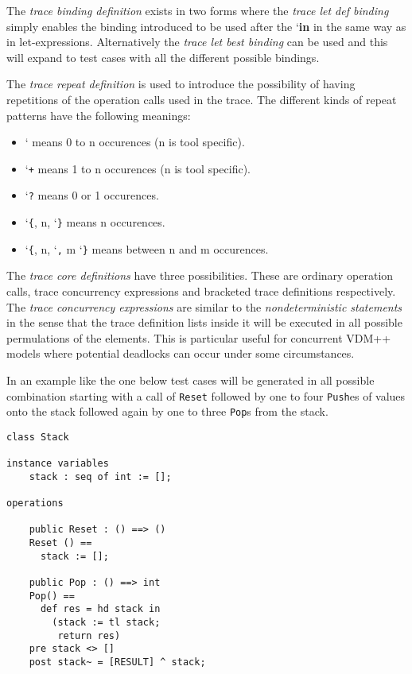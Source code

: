 \documentclass{overturerepchap}
\newcommand{\Lit}[1]{`{\tt #1}\Quote}
\newcommand{\Lop}[1]{`{\bf\ttfamily #1}\Quote}
\begin{document}
{\begin{description}
The \emph{trace binding definition} exists in two forms where the
\emph{trace let def binding} simply enables the binding introduced to
be used after the \Lop{in} in the same way as in
let-expressions. Alternatively the \emph{trace let best binding} can
be used and this will expand to test cases with all the different
possible bindings.

The \emph{trace repeat definition} is used to introduce the
possibility of having repetitions of the operation calls used in the
trace.
The different kinds of repeat patterns have the following meanings:
\begin{itemize}
\item  \Lit{*} means 0 to n occurences (n is tool specific).
\item  \Lit{+} means 1 to n occurences (n is tool specific).
\item  \Lit{?} means 0 or 1 occurences.
\item  \Lit{\{}, n, \Lit{\}} means n occurences.
\item  \Lit{\{}, n, \Lit{,} m \Lit{\}} means between n and m occurences.
\end{itemize}

The \emph{trace core definitions} have three possibilities. These are
ordinary operation calls, trace concurrency expressions and bracketed
trace definitions respectively.
The \emph{trace concurrency expressions} are similar to the
\emph{nondeterministic statements} in the sense that the trace
definition lists inside it will be executed in all possible
permulations of the elements. This is particular useful for concurrent
VDM++ models where potential deadlocks can occur under some
circumstances.

\item[Examples:] In an example like the one below test cases will be
generated in all possible combination starting with a call
of \texttt{Reset} followed by one to four \texttt{Push}es of values
onto the stack followed again by one to three \texttt{Pop}s from the stack. \\
\begin{lstlisting}
class Stack

instance variables
    stack : seq of int := [];

operations

    public Reset : () ==> ()
    Reset () ==
      stack := [];

    public Pop : () ==> int
    Pop() ==
      def res = hd stack in
        (stack := tl stack;
         return res)
    pre stack <> []
    post stack~ = [RESULT] ^ stack;


\end{lstlisting}
\end{description}}
\end{document}
